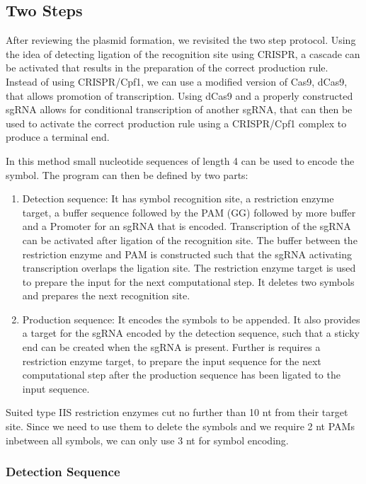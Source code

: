 \documentclass[
11pt, %
a4paper, %
oneside, %
headinclude,footinclude, %
BCOR5mm, %
]{scrartcl}
\begin{document}
\subsection{Two Steps}

After reviewing the plasmid formation, we revisited the two step protocol. Using
the idea of detecting ligation of the recognition site using CRISPR, a cascade
can be activated that results in the preparation of the correct production rule.
Instead of using CRISPR/Cpf1, we can use a modified version of Cas9, dCas9, that
allows promotion of transcription. Using dCas9 and a properly constructed sgRNA
allows for conditional transcription of another sgRNA, that can then be used to
activate the correct production rule using a CRISPR/Cpf1 complex to produce a
terminal end.

In this method small nucleotide sequences of length 4 can be used to encode the
symbol. The program can then be defined by two parts:
\begin{enumerate}
  \item Detection sequence: It has symbol recognition site, a restriction enzyme
    target, a buffer sequence followed by the PAM (GG) followed by more buffer
    and a Promoter for an sgRNA that is encoded. Transcription of the sgRNA can
    be activated after ligation of the recognition site. The buffer between the
    restriction enzyme and PAM is constructed such that the sgRNA activating
    transcription overlaps the ligation site. The restriction enzyme target is
    used to prepare the input for the next computational step. It deletes two
    symbols and prepares the next recognition site.
  \item Production sequence: It encodes the symbols to be appended. It also
    provides a target for the sgRNA encoded by the detection sequence, such that
    a sticky end can be created when the sgRNA is present. Further is requires a
    restriction enzyme target, to prepare the input sequence for the next
    computational step after the production sequence has been ligated to the
    input sequence.
\end{enumerate}
Suited type IIS restriction enzymes cut no further than 10 nt from their target
site. Since we need to use them to delete the symbols and we require 2 nt PAMs
inbetween all symbols, we can only use 3 nt for symbol encoding.

\subsubsection{Detection Sequence}
\end{document}

